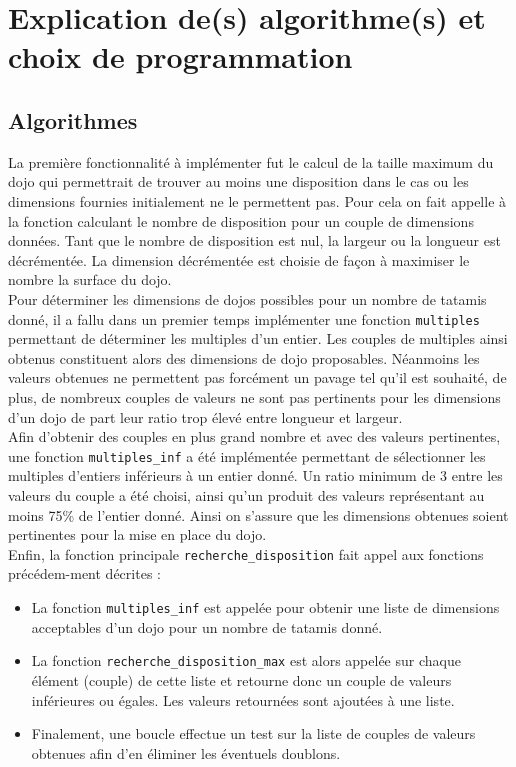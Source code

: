 \section{Explication de(s) algorithme(s) et choix de programmation}

\subsection{Algorithmes}

La première fonctionnalité à implémenter fut le calcul de la taille maximum du dojo qui permettrait de trouver au moins une disposition 
dans le cas ou les dimensions fournies initialement ne le permettent pas. Pour cela on fait appelle à la fonction calculant le nombre 
de disposition pour un couple de dimensions données. Tant que le nombre de disposition est nul, la largeur ou la longueur est décrémentée. 
La dimension décrémentée est choisie de façon à maximiser le nombre la surface du dojo.\\

Pour déterminer les dimensions de dojos possibles pour un nombre de tatamis donné, il a fallu dans un premier temps implémenter 
une fonction \texttt{multiples} permettant de déterminer les multiples d’un entier. Les couples de multiples ainsi obtenus constituent alors des dimensions 
de dojo proposables. Néanmoins les valeurs obtenues ne permettent pas forcément un pavage tel qu’il est souhaité, de plus, de nombreux 
couples de valeurs ne sont pas pertinents pour les dimensions d’un dojo de part leur ratio trop élevé entre longueur et largeur.\\

Afin d’obtenir des couples en plus grand nombre et avec des valeurs pertinentes, une fonction \texttt{multiples\_inf} a été implémentée permettant de sélectionner 
les multiples d’entiers inférieurs à un entier donné.  Un ratio minimum de 3 entre les valeurs du couple a été choisi, ainsi qu’un produit 
des valeurs représentant au moins 75\% de l’entier donné. Ainsi on s’assure que les dimensions obtenues soient pertinentes pour la mise en 
place du dojo.\\

Enfin, la fonction principale \texttt{recherche\_disposition} fait appel aux fonctions précédem-ment décrites :
\begin{itemize}
    \item La fonction \texttt{multiples\_inf} est appelée pour obtenir une liste de dimensions acceptables d’un dojo pour un nombre de tatamis donné.
    \item La fonction \texttt{recherche\_disposition\_max} est alors appelée sur chaque élément (couple) de cette liste et retourne donc un couple de 
    valeurs inférieures ou égales. Les valeurs retournées sont ajoutées à une liste.
    \item Finalement, une boucle effectue un test sur la liste de couples de valeurs obtenues afin d’en éliminer les éventuels doublons.
\end{itemize}

